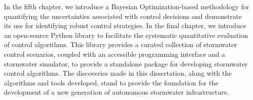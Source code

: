 In the fifth chapter, we introduce a Bayesian Optimization-based methodology for quantifying the uncertainties associated with control decisions and demonstrate its use for identifying robust control strategies.
In the final chapter, we introduce an open-source Python library to facilitate the systematic quantitative evaluation of control algorithms.
This library provides a curated collection of stormwater control scenarios, coupled with an accessible programming interface and a stormwater simulator, to provide a standalone package for developing stormwater control algorithms.
The discoveries made in this dissertation, along with the algorithms and tools developed, stand to provide the foundation for the development of a new generation of autonomous stormwater infrastructure.
\endgroup

\vfill
